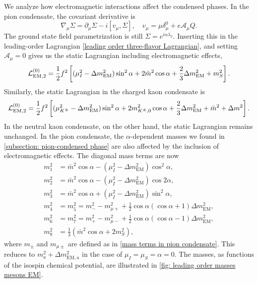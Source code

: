 We analyze how electromagnetic interactions affect the condensed phases.
In the pion condensate, the covariant derivative is
%
\begin{equation}
    \nabla_\mu \Sigma = \partial_\mu \Sigma - i [v_\mu, \Sigma],
    \quad
    v_\mu = \mu \delta_\mu^0 + e \mathcal{A}_\mu Q.
\end{equation}
%
The ground state field parametrization is still $\Sigma = e^{i\alpha\lambda_2}$.
Inserting this in the leading-order Lagrangian \autoref{leading order three-flavor Lagrangian}, and setting $\mathcal A_\mu = 0$ gives us the static Lagrangian including electromagnetic effects,
%
\begin{equation}
    \label{static Lagrangian three-flavor EM}
    \mathcal{L}_{\text{EM}, 2}^{(0)}
    =
    \frac{1}{2} f^2
    \left[
        (\mu_I^2 - \Delta m_\text{EM}^2)\sin^2\alpha + 2 \bar m^2\cos\alpha 
        + \frac{2}{3}\Delta m_\text{EM}^2 + m_S^2
    \right].
\end{equation}
%
Similarly, the static Lagrangian in the charged kaon condensate is
%
\begin{equation}
    \label{static Lagrangian three-flavor EM kaon}
    \mathcal{L}_{\text{EM}, 2}^{(0)}
    =
    \frac{1}{2} f^2
    \left[
        (\mu_{K^\pm}^2 - \Delta m_\text{EM}^2) \sin^2\alpha + 2 m_{{K^\pm},0}^2\cos\alpha 
        + \frac{2}{3}\Delta m_\text{EM}^2 + \bar m^2 + \Delta m^2
    \right].
\end{equation}
%
In the neutral kaon condensate, on the other hand, the static Lagrangian remains unchanged.
In the pion condensate, the $\alpha$-dependent masses we found in \autoref{subsection: pion-condensed phase} are also affected by the inclusion of electromagnetic effects.
The diagonal mass terms are now 
%
\begingroup
\allowdisplaybreaks
\begin{align}
    \label{m1 EM}
    m_1^2 &=  \bar m^2\cos\alpha - (\mu_I^2 - \Delta m_\text{EM}^2) \cos^2\alpha,\\
    \label{m2 EM}
    m_2^2 &= \bar m^2\cos\alpha - (\mu_I^2  - \Delta m_\text{EM}^2)\cos2\alpha, \\
    \label{m3 EM}
    m_3^2 &= \bar m^2\cos\alpha + (\mu_I^2  - \Delta m_\text{EM}^2)\sin^2\alpha, \\
    \label{m4 EM}
    m_4^2 &= m_5^2 = m_-^2 - m_{\mu+}^2 + \frac{1}{2}\cos\alpha(\cos\alpha + 1) \Delta m_\text{EM}^2 , \\
    \label{m7 EM}
    m_6^2 &= m_7^2 = m_+^2 - m^2_{\mu-} + \frac{1}{2}\cos\alpha(\cos\alpha - 1) \Delta m_\text{EM}^2, \\
    \label{m8 EM}
    m_8^2 &= \frac{1}{3} (\bar m^2 \cos\alpha + 2 m_S^2),
\end{align}
\endgroup
%
where $m_\pm$ and $m_{\mu \pm}$ are defined as in \autoref{mass terms in pion condensate}.
This reduces to $m_ a^2 + \Delta m_{\text{EM}, a}^2$ in the case of $\mu_I = \mu_S = \alpha = 0$.
The masses, as functions of the isospin chemical potential, are illustrated in \autoref{fig: leading order masses mesons EM}.



